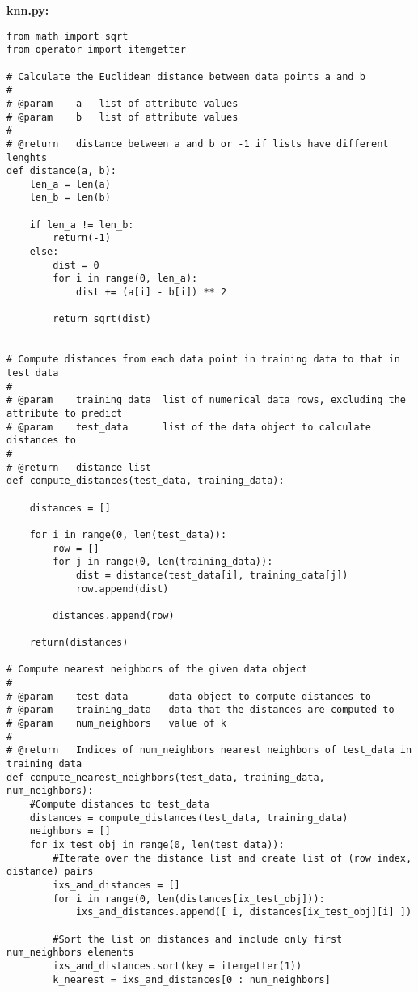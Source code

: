 \documentclass[a4paper]{article}
\begin{document}
\vspace*{1cm}
\normalsize
\textbf{knn.py:}\\
\footnotesize
\begin{lstlisting}
from math import sqrt
from operator import itemgetter

# Calculate the Euclidean distance between data points a and b
#
# @param    a   list of attribute values
# @param    b   list of attribute values
#
# @return   distance between a and b or -1 if lists have different lenghts 
def distance(a, b):
    len_a = len(a)
    len_b = len(b)

    if len_a != len_b:
        return(-1)
    else:
        dist = 0
        for i in range(0, len_a):
            dist += (a[i] - b[i]) ** 2

        return sqrt(dist)


# Compute distances from each data point in training data to that in test data
#
# @param    training_data  list of numerical data rows, excluding the attribute to predict
# @param    test_data      list of the data object to calculate distances to
#
# @return   distance list
def compute_distances(test_data, training_data):

    distances = []
    
    for i in range(0, len(test_data)):
        row = []
        for j in range(0, len(training_data)):
            dist = distance(test_data[i], training_data[j])
            row.append(dist)

        distances.append(row)

    return(distances)

# Compute nearest neighbors of the given data object
#
# @param    test_data       data object to compute distances to
# @param    training_data   data that the distances are computed to
# @param    num_neighbors   value of k
#
# @return   Indices of num_neighbors nearest neighbors of test_data in training_data
def compute_nearest_neighbors(test_data, training_data, num_neighbors):
    #Compute distances to test_data
    distances = compute_distances(test_data, training_data)
    neighbors = []
    for ix_test_obj in range(0, len(test_data)):
        #Iterate over the distance list and create list of (row index, distance) pairs
        ixs_and_distances = []
        for i in range(0, len(distances[ix_test_obj])):
            ixs_and_distances.append([ i, distances[ix_test_obj][i] ])

        #Sort the list on distances and include only first num_neighbors elements
        ixs_and_distances.sort(key = itemgetter(1))
        k_nearest = ixs_and_distances[0 : num_neighbors]


\end{lstlisting}
\end{document}
